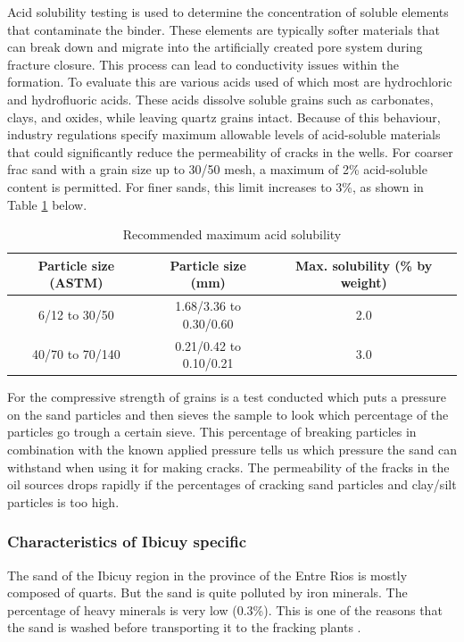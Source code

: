Acid solubility testing is used to determine the concentration of soluble elements that contaminate the binder. These elements are typically softer materials that can break down and migrate into the artificially created pore system during fracture closure. This process can lead to conductivity issues within the formation.
To evaluate this are various acids  used of which most are hydrochloric and hydrofluoric acids. These acids dissolve soluble grains such as carbonates, clays, and oxides, while leaving quartz grains intact. Because of this behaviour, industry regulations specify maximum allowable levels of acid-soluble materials that could significantly reduce the permeability of cracks in the wells.
For coarser frac sand with a grain size up to 30/50 mesh, a maximum of 2\% acid-soluble content is permitted. For finer sands, this limit increases to 3\%, as shown in Table \ref{tab:acid} below.

\begin{table}[H]
\centering
\caption{Recommended maximum acid solubility \autocite{secretariadepoliticamineraArenasParaFracking2019}}
\begin{tabular}{ccc}
\hline
Particle size (ASTM) & Particle size (mm) & Max. solubility (\% by weight) \\ \hline
6/12 to 30/50 & 1.68/3.36 to 0.30/0.60 & 2.0 \\
40/70 to 70/140 & 0.21/0.42 to 0.10/0.21 & 3.0 \\
\hline
\end{tabular}
\label{tab:acid}
\end{table}

For the compressive strength of grains is a test conducted which puts a pressure on the sand particles and then sieves the sample to look which percentage of the particles go trough a certain sieve. This percentage of breaking particles in combination with the known applied pressure tells us which pressure the sand can withstand when using it for making cracks.
The permeability of the fracks in the oil sources drops rapidly if the percentages of cracking sand particles and clay/silt particles is too high. 

\subsubsection{Characteristics of Ibicuy specific}

The sand of the Ibicuy region in the province of the Entre Rios is mostly composed of quarts. But the sand is quite polluted by iron minerals. The percentage of heavy minerals is very low (0.3\%). This is one of the reasons that the sand is washed before transporting it to the fracking plants \autocite{secretariadepoliticamineraArenasParaFracking2019}. 

